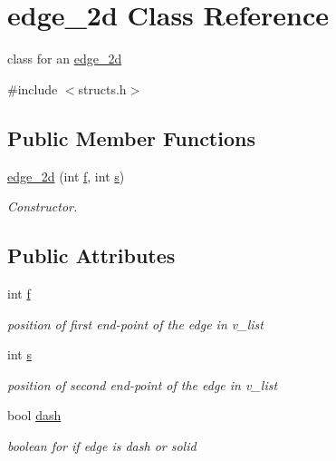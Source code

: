 \hypertarget{classedge__2d}{}\section{edge\+\_\+2d Class Reference}
\label{classedge__2d}


class for an \hyperlink{classedge__2d}{edge\+\_\+2d}  




{\ttfamily \#include $<$structs.\+h$>$}

\subsection*{Public Member Functions}
\begin{DoxyCompactItemize}
\item 
\hyperlink{classedge__2d_ae47aaf1d12e5b02d50d0f36a2ecfab9b}{edge\+\_\+2d} (int \hyperlink{classedge__2d_ad73d78b82f27e853c66ba2c5ada41cc3}{f}, int \hyperlink{classedge__2d_ad3170a4b517acc63b33d02ed73674e8f}{s})
\begin{DoxyCompactList}\small\item\em Constructor. \end{DoxyCompactList}\end{DoxyCompactItemize}
\subsection*{Public Attributes}
\begin{DoxyCompactItemize}
\item 
int \hyperlink{classedge__2d_ad73d78b82f27e853c66ba2c5ada41cc3}{f}
\begin{DoxyCompactList}\small\item\em position of first end-\/point of the edge in v\+\_\+list \end{DoxyCompactList}\item 
int \hyperlink{classedge__2d_ad3170a4b517acc63b33d02ed73674e8f}{s}
\begin{DoxyCompactList}\small\item\em position of second end-\/point of the edge in v\+\_\+list \end{DoxyCompactList}\item 
bool \hyperlink{classedge__2d_aaa20270cfea32dee1808201e3f5d0929}{dash}
\begin{DoxyCompactList}\small\item\em boolean for if edge is dash or solid \end{DoxyCompactList}\end{DoxyCompactItemize}



